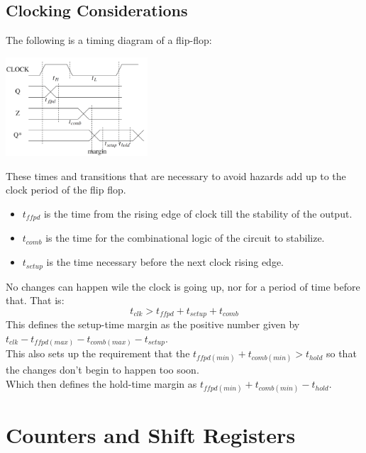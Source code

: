 \documentclass[nobib]{tufte-handout}
\begin{document}
    \subsection{Clocking Considerations}
    The following is a timing diagram of a flip-flop:
    \begin{center}
        \includegraphics[width = 200px]{images/flipfloptiming.png}
    \end{center}
    These times and transitions that are necessary to avoid hazards add up to the clock period of the flip flop.
    \begin{itemize}
        \item $t_{ffpd}$ is the time from the rising edge of clock till the stability of the output.
        \item $t_{comb}$ is the time for the combinational logic of the circuit to stabilize.
        \item $t_{setup}$ is the time necessary before the next clock rising edge.
    \end{itemize}
    No changes can happen wile the clock is going up, nor for a period of time before that. That is:\\
    \begin{equation*}
        t_{clk}>t_{ffpd}+t_{setup}+t_{comb}
    \end{equation*}
    This defines the setup-time margin as the positive number given by $t_{clk}-t_{ffpd(max)}-t_{comb(max)}-t_{setup}$.\\
    This also sets up the requirement that the $t_{ffpd(min)}+t_{comb(min)}>t_{hold}$ so that the changes don't begin to happen too soon.\\
    Which then defines the hold-time margin as $t_{ffpd(min)}+t_{comb(min)}-t_{hold}$.\\
    \section{Counters and Shift Registers}
\end{document}
